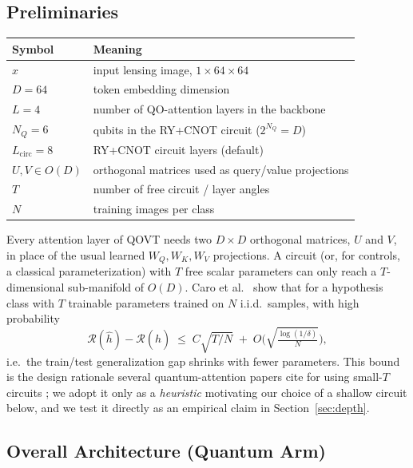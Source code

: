 \documentclass[10pt,letterpaper]{article}
\theoremstyle{plain}
\theoremstyle{definition}
\begin{document}
\subsection{Preliminaries}
\label{sec:notation}

\begin{table}[h]
\centering\small
\begin{tabular}{@{}ll@{}}
\toprule
Symbol & Meaning \\
\midrule
$x$ & input lensing image, $1{\times}64{\times}64$ \\
$D{=}64$ & token embedding dimension \\
$L{=}4$ & number of QO-attention layers in the backbone \\
$N_Q{=}6$ & qubits in the RY+CNOT circuit ($2^{N_Q}{=}D$) \\
$L_\mathrm{circ}{=}8$ & RY+CNOT circuit layers (default) \\
$U,V\in O(D)$ & orthogonal matrices used as query/value projections \\
$T$ & number of free circuit / layer angles \\
$N$ & training images per class \\
\bottomrule
\end{tabular}
\end{table}

Every attention layer of QOVT needs two $D{\times}D$ orthogonal matrices,
$U$ and $V$, in place of the usual learned $W_Q,W_K,W_V$ projections. A
circuit (or, for controls, a classical parameterization) with $T$ free
scalar parameters can only reach a $T$-dimensional sub-manifold of
$O(D)$. Caro et al.~\citep{caro2022} show that for a hypothesis class with $T$
trainable parameters trained on $N$ i.i.d.\ samples, with high probability
\[
\mathcal{R}(\hat h) - \hat{\mathcal{R}}(\hat h) \;\le\; C\sqrt{T/N} \;+\;
O\!\Big(\sqrt{\tfrac{\log(1/\delta)}{N}}\Big),
\]
i.e.\ the train/test generalization gap shrinks with fewer parameters. This
bound is the design rationale several quantum-attention papers cite for
using small-$T$ circuits \citep{huang2021power,liu2021rigorous}; we adopt
it only as a \emph{heuristic} motivating our choice of a shallow circuit
below, and we test it directly as an empirical claim in
Section~\ref{sec:depth}.

\subsection{Overall Architecture (Quantum Arm)}
\label{sec:arch}
\end{document}
